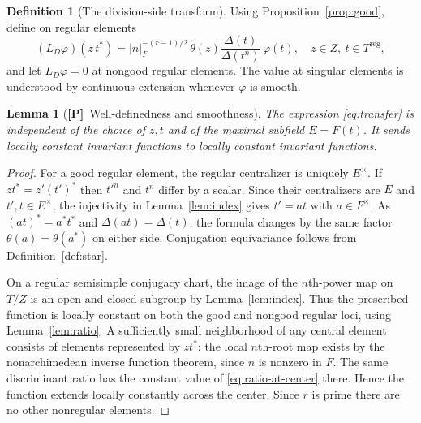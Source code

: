 \documentclass[11pt]{article}
\newcommand{\tZ}{\widetilde Z}
\newcommand{\reg}{\mathrm{reg}}
\newcommand{\Ptag}{\textnormal{\textbf{[P]}}}
\theoremstyle{plain}
\newtheorem{lemma}[theorem]{Lemma}
\theoremstyle{definition}
\newtheorem{definition}[theorem]{Definition}
\begin{document}
\begin{definition}[The division-side transform]\label{def:L}
Using Proposition~\ref{prop:good}, define on regular elements
\begin{equation}\label{eq:transfer}
\boxed{\quad
(L_D\varphi)(z\,t^*)=
|n|_F^{-(r-1)/2}\,\widetilde\theta(z)
\frac{\Delta(t)}{\Delta(t^n)}\,\varphi(t),
\quad z\in\tZ,
\ t\in T^{\reg},\quad}
\end{equation}
and let $L_D\varphi=0$ at nongood regular elements. The value at singular elements is understood by continuous extension whenever $\varphi$ is smooth.
\end{definition}

\begin{lemma}[\Ptag\ Well-definedness and smoothness]\label{lem:well-defined}
The expression \eqref{eq:transfer} is independent of the choice of $z,t$ and of the maximal subfield $E=F(t)$. It sends locally constant invariant functions to locally constant invariant functions.
\end{lemma}
\begin{proof}
For a good regular element, the regular centralizer is uniquely $E^\times$. If $zt^*=z'(t')^*$ then $t'^n$ and $t^n$ differ by a scalar. Since their centralizers are $E$ and $t',t\in E^\times$, the injectivity in Lemma~\ref{lem:index} gives $t'=at$ with $a\in F^\times$. As $(at)^*=a^*t^*$ and $\Delta(at)=\Delta(t)$, the formula changes by the same factor $\theta(a)=\widetilde\theta(a^*)$ on either side. Conjugation equivariance follows from Definition~\ref{def:star}.

On a regular semisimple conjugacy chart, the image of the $n$th-power map on $T/Z$ is an open-and-closed subgroup by Lemma~\ref{lem:index}. Thus the prescribed function is locally constant on both the good and nongood regular loci, using Lemma~\ref{lem:ratio}. A sufficiently small neighborhood of any central element consists of elements represented by $z t^*$: the local $n$th-root map exists by the nonarchimedean inverse function theorem, since $n$ is nonzero in $F$. The same discriminant ratio has the constant value of \eqref{eq:ratio-at-center} there. Hence the function extends locally constantly across the center. Since $r$ is prime there are no other nonregular elements.
\end{proof}
\end{document}
